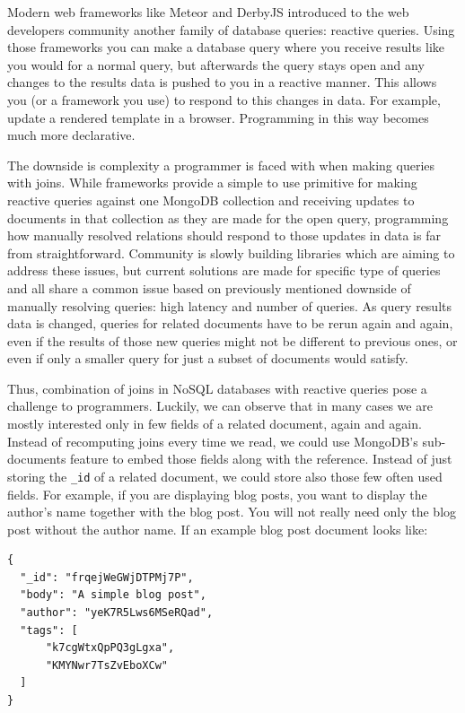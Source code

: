 Modern web frameworks like Meteor and DerbyJS introduced to the web developers community another family of database queries: reactive queries.
Using those frameworks you can make a database query where you receive results like you would for a normal query, but afterwards the query stays open and any changes to the results data is pushed to you in a reactive manner.
This allows you (or a framework you use) to respond to this changes in data.
For example, update a rendered template in a browser.
Programming in this way becomes much more declarative.

The downside is complexity a programmer is faced with when making queries with joins.
While frameworks provide a simple to use primitive for making reactive queries against one MongoDB collection and receiving updates to documents in that collection as they are made for the open query, programming how manually resolved relations should respond to those updates in data is far from straightforward.
Community is slowly building libraries which are aiming to address these issues, but current solutions are made for specific type of queries and all share a common issue based on previously mentioned downside of manually resolving queries: high latency and number of queries.
As query results data is changed, queries for related documents have to be rerun again and again, even if the results of those new queries might not be different to previous ones, or even if only a smaller query for just a subset of documents would satisfy.

Thus, combination of joins in NoSQL databases with reactive queries pose a challenge to programmers.
Luckily, we can observe that in many cases we are mostly interested only in few fields of a related document, again and again.
Instead of recomputing joins every time we read, we could use MongoDB's sub-documents feature to embed those fields along with the reference.
Instead of just storing the \verb|_id| of a related document, we could store also those few often used fields.
For example, if you are displaying blog posts, you want to display the author's name together with the blog post.
You will not really need only the blog post without the author name.
If an example blog post document looks like:

\begin{verbatim}
{
  "_id": "frqejWeGWjDTPMj7P",
  "body": "A simple blog post",
  "author": "yeK7R5Lws6MSeRQad",
  "tags": [
      "k7cgWtxQpPQ3gLgxa",
      "KMYNwr7TsZvEboXCw"
  ]
}
\end{verbatim}

